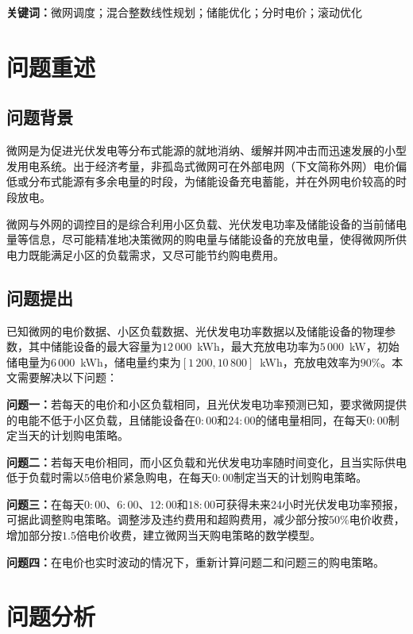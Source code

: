 \documentclass[12pt,a4paper]{ctexart}
\theoremstyle{definition}
\theoremstyle{plain}
\theoremstyle{remark}
\newcommand{\keywords}[1]{%
  \par\noindent\textbf{关键词：}#1}
\begin{document}
\keywords{微网调度；混合整数线性规划；储能优化；分时电价；滚动优化}


\section{问题重述}

\subsection{问题背景}
微网是为促进光伏发电等分布式能源的就地消纳、缓解并网冲击而迅速发展的小型发用电系统。出于经济考量，非孤岛式微网可在外部电网（下文简称外网）电价偏低或分布式能源有多余电量的时段，为储能设备充电蓄能，并在外网电价较高的时段放电。

微网与外网的调控目的是综合利用小区负载、光伏发电功率及储能设备的当前储电量等信息，尽可能精准地决策微网的购电量与储能设备的充放电量，使得微网所供电力既能满足小区的负载需求，又尽可能节约购电费用。
\subsection{问题提出}

已知微网的电价数据、小区负载数据、光伏发电功率数据以及储能设备的物理参数，其中储能设备的最大容量为$12\,000$~kWh，最大充放电功率为$5\,000$~kW，初始储电量为$6\,000$~kWh，储电量约束为$[1\,200, 10\,800]$~kWh，充放电效率为$90\%$。本文需要解决以下问题：

\textbf{问题一：}若每天的电价和小区负载相同，且光伏发电功率预测已知，要求微网提供的电能不低于小区负载，且储能设备在$0{:}00$和$24{:}00$的储电量相同，在每天$0{:}00$制定当天的计划购电策略。

\textbf{问题二：}若每天电价相同，而小区负载和光伏发电功率随时间变化，且当实际供电低于负载时需以$5$倍电价紧急购电，在每天$0{:}00$制定当天的计划购电策略。

\textbf{问题三：}在每天$0{:}00$、$6{:}00$、$12{:}00$和$18{:}00$可获得未来24小时光伏发电功率预报，可据此调整购电策略。调整涉及违约费用和超购费用，减少部分按$50\%$电价收费，增加部分按$1.5$倍电价收费，建立微网当天购电策略的数学模型。

\textbf{问题四：}在电价也实时波动的情况下，重新计算问题二和问题三的购电策略。


\section{问题分析}
\end{document}
